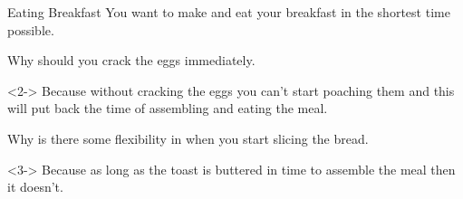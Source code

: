 \documentclass[8pt]{beamer}
\begin{document}
\begin{frame}{Eating Breakfast}
	You want to make and eat your breakfast in the shortest time possible.
	
	\begin{problem}
		Why should you crack the eggs immediately.
	\end{problem}
	
	\begin{solution}<2->
		Because without cracking the eggs you can’t start poaching them and this will put back the time of assembling and eating the meal.
	\end{solution}

	\begin{problem}
		Why is there some flexibility in when you start slicing the bread.
		
	\end{problem}

	\begin{solution}<3->
		Because as long as the toast is buttered in time to assemble the meal then it doesn't.
		
	\end{solution}
\end{frame}
\end{document}
